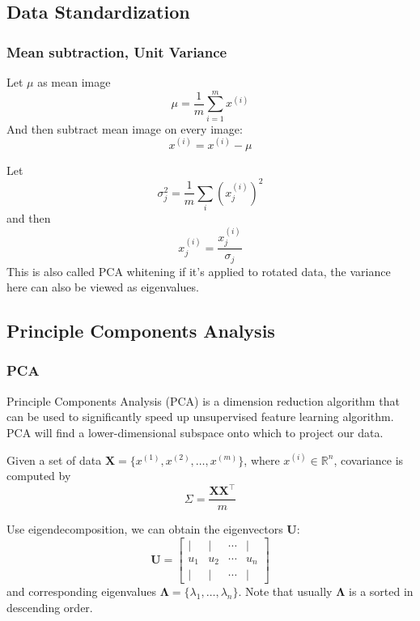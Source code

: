 \documentclass{beamer}
\begin{document}
\subsection{Data Standardization}

\begin{frame}
  \frametitle{Mean subtraction, Unit Variance}

  Let $\mu$ as mean image
  \begin{equation*}
    \mu=\frac{1}{m}\sum_{i=1}^{m} x^{(i)}
  \end{equation*}
  And then subtract mean image on every image:
  \begin{equation*}
    x^{(i)}=x^{(i)}-\mu
  \end{equation*}

  Let
  \begin{equation*}
    \sigma_{j}^{2}=\frac{1}{m}\sum_{i}\left(x_{j}^{(i)}\right)^{2}
  \end{equation*}
  and then
  \begin{equation*}
    x_{j}^{(i)}=\frac{x_{j}^{(i)}}{\sigma_{j}}
  \end{equation*}
  This is also called PCA whitening if it's applied to rotated data, the variance here can also be viewed as eigenvalues.
\end{frame}

\subsection{Principle Components Analysis}

\begin{frame}
    \frametitle{PCA}

    Principle Components Analysis (PCA) is a dimension reduction algorithm that can be used to significantly speed up unsupervised feature learning algorithm. PCA will find a lower-dimensional subspace onto which to project our data.

    Given a set of data $\bm{X}=\{x^{(1)}, x^{(2)}, \ldots, x^{(m)}\}$, where $x^{(i)}\in\mathbb{R}^{n}$, covariance is computed by
    \begin{equation*}
      \Sigma=\frac{\bm{X}\bm{X}^{\top}}{m}
    \end{equation*}

    Use eigendecomposition, we can obtain the eigenvectors $\bm{U}$:
    \begin{equation*}
      \bm{U}=\left[\begin{matrix}
          | & | & \cdots & | \\
          u_{1} & u_{2} & \cdots & u_{n} \\
          | & | & \cdots & |
        \end{matrix}\right]
    \end{equation*}
    and corresponding eigenvalues $\bm{\Lambda}=\{\lambda_{1}, \ldots, \lambda_{n}\}$. Note that usually $\bm{\Lambda}$ is a sorted in descending order.
\end{frame}
\end{document}
